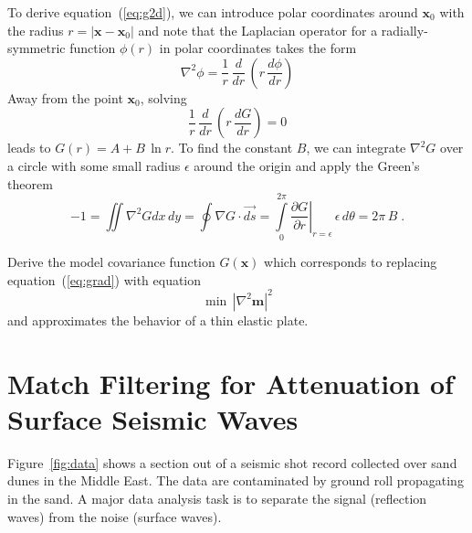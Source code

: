 To derive equation~(\ref{eq:g2d}), we can introduce polar coordinates
around $\mathbf{x}_0$ with the radius $r= |\mathbf{x}-\mathbf{x}_0|$
and note that the Laplacian operator for a radially-symmetric function
$\phi(r)$ in polar coordinates takes the form
\begin{equation}
\label{eq:polar}
\nabla^2 \phi = \displaystyle \frac{1}{r}\,\frac{d}{dr}\,\left(r\,\frac{d \phi}{dr}\right)
\end{equation}  
Away from the point $\mathbf{x}_0$, solving
\begin{equation}
\label{eq:away}
\frac{1}{r}\,\frac{d}{dr}\,\left(r\,\frac{d G}{dr}\right) = 0
\end{equation}
leads to $G(r) = A + B\,\ln r$. To find the constant $B$, we can
integrate $\nabla^2 G$ over a circle with some small radius $\epsilon$
around the origin and apply the Green's theorem
\begin{equation}
\label{eq:integrate}
-1 = \iint \nabla^2 G dx\,dy = \oint \nabla G \cdot \vec{ds} = 
\int\limits_{0}^{2\pi} \left.\frac{\partial G}{\partial r}\right|_{r=\epsilon}\,\epsilon\,d\theta = 2\pi\,B\;.
\end{equation}

Derive the model covariance function $G(\mathbf{x})$ which corresponds
to replacing equation~(\ref{eq:grad}) with equation
\begin{equation}
\label{eq:lap}
\min\,\left|\nabla^2 \mathbf{m}\right|^2
\end{equation} 
and approximates the behavior of a thin elastic plate.


\section{Match Filtering for Attenuation of Surface Seismic Waves}


Figure~\ref{fig:data} shows a section out of a seismic shot record
collected over sand dunes in the Middle East. The data are
contaminated by ground roll propagating in the sand. A major data
analysis task is to separate the signal (reflection waves) from the
noise (surface waves).


